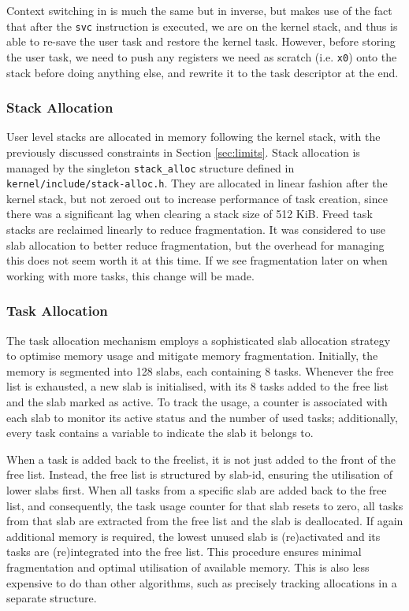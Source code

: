 \documentclass[12pt, titlepage]{article}
\begin{document}
    Context switching in is much the same but in inverse, but makes use of the fact that after the \verb`svc` instruction is executed, we are on the kernel stack, and thus is able to re-save the user task and restore the kernel task. However, before storing the user task, we need to push any registers we need as scratch (i.e. \verb`x0`) onto the stack before doing anything else, and rewrite it to the task descriptor at the end.

    \subsubsection{Stack Allocation}

    User level stacks are allocated in memory following the kernel stack, with the previously discussed constraints in Section \ref{sec:limits}. Stack allocation is managed by the singleton \verb`stack_alloc` structure defined in \verb`kernel/include/stack-alloc.h`. They are allocated in linear fashion after the kernel stack, but not zeroed out to increase performance of task creation, since there was a significant lag when clearing a stack size of 512 KiB. Freed task stacks are reclaimed linearly to reduce fragmentation. It was considered to use slab allocation to better reduce fragmentation, but the overhead for managing this does not seem worth it at this time. If we see fragmentation later on when working with more tasks, this change will be made.

    \subsubsection{Task Allocation}
    \label{sec:task-alloc}

    The task allocation mechanism employs a sophisticated slab allocation strategy to optimise memory usage and mitigate memory fragmentation.
    Initially, the memory is segmented into 128 slabs, each containing 8 tasks.
    Whenever the free list is exhausted, a new slab is initialised, with its 8 tasks added to the free list and the slab marked as active.
    To track the usage, a counter is associated with each slab to monitor its active status and the number of used tasks;
    additionally, every task contains a variable to indicate the slab it belongs to.

    When a task is added back to the freelist, it is not just added to the front of the free list.
    Instead, the free list is structured by slab-id, ensuring the utilisation of lower slabs first.
    When all tasks from a specific slab are added back to the free list, and consequently, the task usage counter for that slab resets to zero, all tasks from that slab are extracted from the free list and the slab is deallocated.
    If again additional memory is required, the lowest unused slab is (re)activated and its tasks are (re)integrated into the free list.
    This procedure ensures minimal fragmentation and optimal utilisation of available memory.
    This is also less expensive to do than other algorithms, such as precisely tracking allocations in a separate structure.
\end{document}
